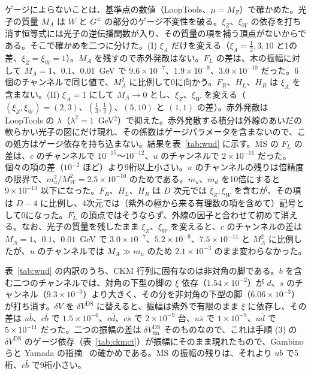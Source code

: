 \documentclass[a4paper,10pt]{ltjsarticle}
\newcommand{\MSbar}{\overline{\mathrm{MS}}}
\begin{document}
ゲージによらないことは、基準点の数値（LoopTools、$\mu=M_Z$）で確かめた。光子の質量 $M_A$ は $W$ と $G^\pm$ の部分のゲージ不変性を破る。$\xi_Z$、$\xi_W$ の依存を打ち消す恒等式には光子の逆伝播関数が入り、その質量の項を補う頂点がないからである。そこで確かめを二つに分けた。(I) $\xi_A$ だけを変える（$\xi_A=\frac12,3,10$ と1の差、$\xi_Z=\xi_W=1$）。$M_A$ を残すので赤外発散はない。$F_L$ の差は、木の振幅に対して $M_A=1$、$0.1$、$0.01$~GeV で $9.6\times10^{-7}$、$1.9\times10^{-8}$、$3.0\times10^{-10}$ だった。6個のチャンネルで同じ値で、$M_A^2$ に比例して0に向かう。$F_R$、$H_L$、$H_R$ は $\xi_A$ を含まない。(II) $\xi_A=1$ にして $M_A\to0$ とし、$\xi_Z$、$\xi_W$ を変える（$(\xi_Z,\xi_W)=(2,3)$、$(\frac13,\frac12)$、$(5,10)$ と $(1,1)$ の差）。赤外発散は LoopTools の $\lambda$（$\lambda^2=1$~GeV$^2$）で抑えた。赤外発散する積分は外線のあいだの軟らかい光子の図にだけ現れ、その係数はゲージパラメータを含まないので、この処方はゲージ依存を持ち込まない。結果を表~\ref{tab:wud} に示す。$\MSbar$ の $F_L$ の差は、$c$ のチャンネルで $10^{-15}$〜$10^{-12}$、$u$ のチャンネルで $2\times10^{-11}$ だった。個々の項の差（$10^{-2}$ ほど）より9桁以上小さい。$u$ のチャンネルの残りは倍精度の限界で、$m_u^2/M_W^2=2.5\times10^{-10}$ のためである。$m_u$、$m_d$ を10倍にすると $9\times10^{-13}$ 以下になった。$F_R$、$H_L$、$H_R$ は $D$ 次元では $\xi_Z,\xi_W$ を含むが、その項は $D-4$ に比例し、4次元では（紫外の極から来る有理数の項を含めて）記号として0になった。$F_L$ の頂点ではそうならず、外線の因子と合わせて初めて消える。なお、光子の質量を残したまま $\xi_Z$、$\xi_W$ を変えると、$c$ のチャンネルの差は $M_A=1$、$0.1$、$0.01$~GeV で $3.0\times10^{-7}$、$5.2\times10^{-9}$、$7.5\times10^{-11}$ と $M_A^2$ に比例したが、$u$ のチャンネルでは $M_A\gg m_u$ のため $2.1\times10^{-3}$ のまま変わらなかった。

表~\ref{tab:wud} の内訳のうち、CKM 行列に固有なのは非対角の脚である。$b$ を含む二つのチャンネルでは、対角の下型の脚の $\xi$ 依存（$1.54\times10^{-2}$）が $d$、$s$ のチャンネル（$9.3\times10^{-3}$）より大きく、その分を非対角の下型の脚（$6.06\times10^{-3}$）が打ち消す。$\delta V$ を $\delta V^{\mathrm{DS}}$ に替えると、振幅は紫外で有限のまま $\xi$ に依存し、その差は $u\bar b$、$c\bar b$ で $1.5\times10^{-6}$、$c\bar d$、$c\bar s$ で $2\times10^{-9}$ 台、$u\bar s$ で $1\times10^{-9}$、$u\bar d$ で $5\times10^{-11}$ だった。二つの振幅の差は $\delta V^{\mathrm{DS}}_{\mathrm{fin}}$ そのものなので、これは手順 (3) の $\delta V^{\mathrm{DS}}$ のゲージ依存（表~\ref{tab:ckmct}）が振幅にそのまま現れたもので、Gambino らと Yamada の指摘~\cite{ggm99,yamada01} の確かめである。$\MSbar$ の振幅の残りは、それより $u\bar b$ で5桁、$c\bar b$ で9桁小さい。
\end{document}
